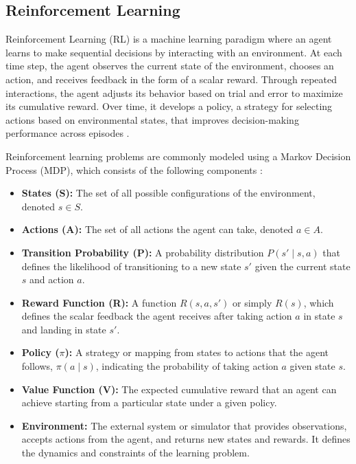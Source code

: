 \documentclass[12pt,oneside,openright,a4paper]{cpe-english-project}
\begin{document}
\subsection{Reinforcement Learning}

Reinforcement Learning (RL) is a machine learning paradigm where an agent learns to make sequential decisions by interacting with an environment. At each time step, the agent observes the current state of the environment, chooses an action, and receives feedback in the form of a scalar reward. Through repeated interactions, the agent adjusts its behavior based on trial and error to maximize its cumulative reward. Over time, it develops a policy, a strategy for selecting actions based on environmental states, that improves decision-making performance across episodes \cite{sutton2018reinforcement}.

Reinforcement learning problems are commonly modeled using a Markov Decision Process (MDP), which consists of the following components \cite{MDPRohan}:
\begin{itemize}
\item \textbf{States (S):} The set of all possible configurations of the environment, denoted $s \in S$.
\item \textbf{Actions (A):} The set of all actions the agent can take, denoted $a \in A$.
\item \textbf{Transition Probability (P):} A probability distribution $P(s'∣s,a)$ that defines the likelihood of transitioning to a new state $s'$ given the current state $s$ and action $a$.
\item \textbf{Reward Function (R):} A function $R(s,a,s')$ or simply $R(s)$, which defines the scalar feedback the agent receives after taking action $a$ in state $s$ and landing in state $s'$.
\item \textbf{Policy ($\pi$):} A strategy or mapping from states to actions that the agent follows, $\pi(a∣s)$, indicating the probability of taking action $a$ given state $s$.
\item \textbf{Value Function (V):} The expected cumulative reward that an agent can achieve starting from a particular state under a given policy.
\item \textbf{Environment:} The external system or simulator that provides observations, accepts actions from the agent, and returns new states and rewards. It defines the dynamics and constraints of the learning problem.
\end{itemize}
\end{document}
